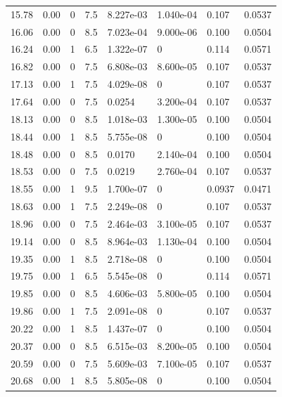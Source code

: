 \documentclass[preview]{standalone}
\begin{document}
{{{\begin{tabular}{L{1.2cm}C{1.2cm} C{0.3cm}C{0.5cm} C{1.4cm}C{1.4cm} C{1.4cm}C{1.4cm}}
  15.78  &  0.00  & 0     & 7.5 &  8.227e-03  & 1.040e-04  & 0.107 &  0.0537   \\ 
  16.06  &  0.00  & 0     & 8.5 &  7.023e-04  & 9.000e-06  & 0.100 &  0.0504   \\ 
  16.24  &  0.00  & 1     & 6.5 &  1.322e-07  & 0  & 0.114 &  0.0571   \\ 
  16.82  &  0.00  & 0     & 7.5 &  6.808e-03  & 8.600e-05  & 0.107 &  0.0537   \\ 
  17.13  &  0.00  & 1     & 7.5 &  4.029e-08  & 0  & 0.107 &  0.0537   \\ 
  17.64  &  0.00  & 0     & 7.5 &  0.0254  & 3.200e-04  & 0.107 &  0.0537   \\ 
  18.13  &  0.00  & 0     & 8.5 &  1.018e-03  & 1.300e-05  & 0.100 &  0.0504   \\ 
  18.44  &  0.00  & 1     & 8.5 &  5.755e-08  & 0  & 0.100 &  0.0504   \\ 
  18.48  &  0.00  & 0     & 8.5 &  0.0170  & 2.140e-04  & 0.100 &  0.0504   \\ 
  18.53  &  0.00  & 0     & 7.5 &  0.0219  & 2.760e-04  & 0.107 &  0.0537   \\ 
  18.55  &  0.00  & 1     & 9.5 &  1.700e-07  & 0  & 0.0937 &  0.0471   \\ 
  18.63  &  0.00  & 1     & 7.5 &  2.249e-08  & 0  & 0.107 &  0.0537   \\ 
  18.96  &  0.00  & 0     & 7.5 &  2.464e-03  & 3.100e-05  & 0.107 &  0.0537   \\ 
  19.14  &  0.00  & 0     & 8.5 &  8.964e-03  & 1.130e-04  & 0.100 &  0.0504   \\ 
  19.35  &  0.00  & 1     & 8.5 &  2.718e-08  & 0  & 0.100 &  0.0504   \\ 
  19.75  &  0.00  & 1     & 6.5 &  5.545e-08  & 0  & 0.114 &  0.0571   \\ 
  19.85  &  0.00  & 0     & 8.5 &  4.606e-03  & 5.800e-05  & 0.100 &  0.0504   \\ 
  19.86  &  0.00  & 1     & 7.5 &  2.091e-08  & 0  & 0.107 &  0.0537   \\ 
  20.22  &  0.00  & 1     & 8.5 &  1.437e-07  & 0  & 0.100 &  0.0504   \\ 
  20.37  &  0.00  & 0     & 8.5 &  6.515e-03  & 8.200e-05  & 0.100 &  0.0504   \\ 
  20.59  &  0.00  & 0     & 7.5 &  5.609e-03  & 7.100e-05  & 0.107 &  0.0537   \\ 
  20.68  &  0.00  & 1     & 8.5 &  5.805e-08  & 0  & 0.100 &  0.0504   \\ 

\end{tabular}}}}
\end{document}
